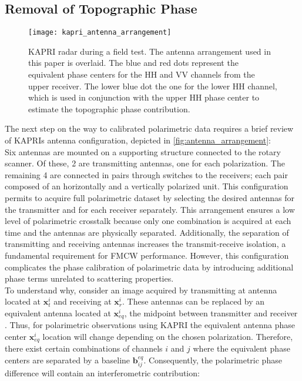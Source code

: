 \subsection{Removal of Topographic Phase}\label{sec:methods:topo_removal}
\begin{figure}[ht]
	\centering
	\texttt{[image: kapri\_antenna\_arrangement]}
	\caption{KAPRI radar during a field test. The antenna arrangement used in this paper is overlaid. The blue and red dots represent the equivalent phase centers for the  HH and VV channels from the upper receiver. The lower blue dot the one for the lower HH channel, which is used in conjunction with the upper HH phase center to estimate the topographic phase contribution.}
	\label{fig:antenna_arrangement}
\end{figure}
 The next step on the way to calibrated polarimetric data requires a brief review of KAPRIs antenna configuration, depicted in \autoref{fig:antenna_arrangement}:\\ Six antennas are mounted on a supporting structure connected to the rotary scanner. Of these, 2 are transmitting antennas, one for each polarization. The remaining 4 are connected in pairs through switches to the receivers; each pair composed of an horizontally and a vertically polarized unit. This configuration permits to acquire full polarimetric dataset by selecting the desired antennas for the transmitter and for each receiver separately. This arrangement ensures a low level of polarimetric crosstalk because only one combination is acquired at each time and the antennas are physically separated. Additionally, the separation of transmitting and receiving antennas increases the transmit-receive isolation, a fundamental requirement for FMCW performance\cite{Beasley1990,Stove1992, Strozzi2011}.  However, this configuration complicates the phase calibration of polarimetric data by introducing additional phase terms unrelated to scattering properties.\\
To understand why, consider an image acquired by transmitting at antenna located at $\mathbf{x}_t^i$ and receiving at $\mathbf{x}_r^i$. These antennas can be replaced by an equivalent antenna located at $\mathbf{x}_{eq}^i$, the midpoint between transmitter and receiver \cite{Pipia2009}. Thus, for polarimetric observations using  KAPRI the equivalent antenna phase center $\mathbf{x}_{eq}^i$ location will change depending on the chosen polarization. Therefore, there exist certain combinations of channels $i$ and $j$ where the equivalent phase centers are separated by a baseline $\mathbf{b}_{ij}^{eq}$. Consequently, the polarimetric phase difference   will contain an interferometric contribution:
